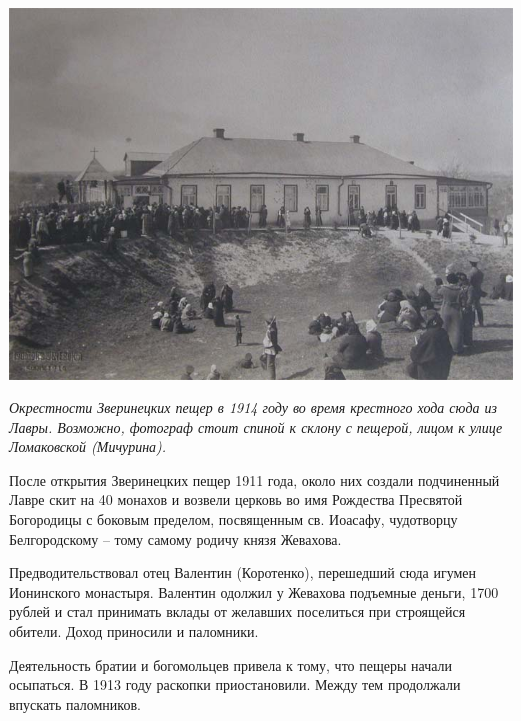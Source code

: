 \begin{center}
\includegraphics[width=\linewidth]{chast-colebanie-osnov/nachalo/1914-kresthod.jpg}

\textit{Окрестности Зверинецких пещер в 1914 году во время крестного хода сюда из Лавры. Возможно, фотограф стоит спиной к склону с пещерой, лицом к улице Ломаковской (Мичурина).}
\end{center}



После открытия Зверинецких пещер 1911 года, около них создали подчиненный Лавре скит на 40 монахов и возвели церковь во имя Рождества Пресвятой Богородицы с боковым пределом, посвященным св. Иоасафу, чудотворцу Белгородскому – тому самому родичу князя Жевахова.

Предводительствовал отец Валентин (Коротенко), перешедший сюда игумен Ионинского монастыря. Валентин одолжил у Жевахова подъемные деньги, 1700 рублей и стал принимать вклады от желавших поселиться при строящейся обители. Доход приносили и паломники.

Деятельность братии и богомольцев привела к тому, что пещеры начали осыпаться. В 1913 году раскопки приостановили. Между тем продолжали впускать паломников. 


